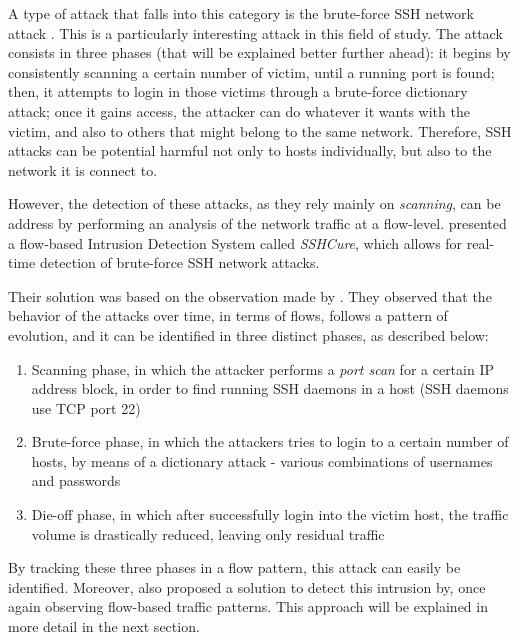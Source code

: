 \documentclass[runningheads,a4paper]{llncs}
\begin{document}
A type of attack that falls into this category is the brute-force SSH network attack \cite{Hellemons2012}. This is a particularly interesting attack in this field of study. The attack consists in three phases (that will be explained better further ahead): it begins by consistently scanning a certain number of victim, until a running port is found; then, it attempts to login in those victims through a brute-force dictionary attack; once it gains access, the attacker can do whatever it wants with the victim, and also to others that might belong to the same network. Therefore, SSH attacks can be potential harmful not only to hosts individually, but also to the network it is connect to. 

However, the detection of these attacks, as they rely mainly on \textit{scanning}, can be address by performing an analysis of the network traffic at a flow-level. \cite{Hellemons2012} presented a flow-based Intrusion Detection System called \textit{SSHCure}, which allows for real-time detection of brute-force SSH network attacks. 

Their solution was based on the observation made by \cite{Northcutt}. They observed that the behavior of the attacks over time, in terms of flows, follows a pattern of evolution, and it can be identified in three distinct phases, as described below:

\begin{enumerate}
	\item Scanning phase, in which the attacker performs a \textit{port scan} for a certain IP address block, in order to find running SSH daemons in a host (SSH daemons use TCP port 22)
	\item Brute-force phase, in which the attackers tries to login to a certain number of hosts, by means of a dictionary attack - various combinations of usernames and passwords
	\item Die-off phase, in which after successfully login into the victim host, the traffic volume is drastically reduced, leaving only residual traffic
\end{enumerate}


By tracking these three phases in a flow pattern, this attack can easily be identified. Moreover, \cite{kim2004flow} also proposed a solution to detect this intrusion by, once again observing flow-based traffic patterns. This approach will be explained in more detail in the next section.

\end{document}
